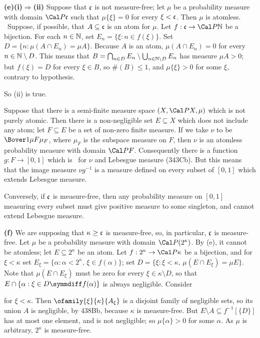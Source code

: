{{\bf (e)(i)$\Rightarrow$(ii)} Suppose that $\frak c$ is not
measure-free;  let $\mu$ be a probability measure with domain
$\Cal P\frak c$
such that $\mu\{\xi\}=0$ for every $\xi<\frak c$.   Then $\mu$ is
atomless.   \Prf\Quer\ Suppose, if possible, that $A\subseteq\frak c$ is
an atom for $\mu$.   Let $f:\frak c\to\Cal P\Bbb N$ be a bijection.
For each $n\in\Bbb N$, set $E_n=\{\xi:n\in f(\xi)\}$.   Set
$D=\{n:\mu(A\cap E_n)=\mu A\}$.   Because $A$ is an atom,
$\mu(A\cap E_n)=0$ for every $n\in\Bbb N\setminus D$.   This means
that $B=\bigcap_{n\in D}E_n\setminus\bigcup_{n\in\Bbb N\setminus D}E_n$
has measure $\mu A>0$;  but $f(\xi)=D$ for every $\xi\in B$, so
$\#(B)\le 1$, and $\mu\{\xi\}>0$ for some $\xi$, contrary to
hypothesis.\ \Bang\Qed

So (ii) is true.

\medskip

 Suppose that there is a semi-finite
measure space $(X,\Cal PX,\mu)$ which is not purely atomic.   Then there
is a non-negligible set $E\subseteq X$ which does not include any atom;
let $F\subseteq E$ be a set of non-zero finite measure.   If we take
$\nu$ to be $\Bover1{\mu F}\mu_F$, where $\mu_F$ is the subspace measure
on $F$, then $\nu$ is an atomless probability measure with domain
$\Cal PF$.
Consequently there is a function $g:F\to[0,1]$ which is \imp\ for $\nu$
and Lebesgue measure (343Cb).   But this means that the image measure
$\nu g^{-1}$ is a measure defined on every subset of $[0,1]$ which
extends Lebesgue measure.

\medskip

 Conversely, if $\frak c$ is
measure-free, then any probability measure on $[0,1]$ measuring every
subset must give positive measure to some singleton, and cannot extend
Lebesgue measure.

\medskip

{\bf (f)} We are supposing that $\kappa\ge\frak c$ is measure-free,
so, in particular, $\frak c$ is measure-free.
Let $\mu$ be a probability measure with domain
$\Cal P(2^{\kappa})$.   By (e), it cannot be atomless;  let
$E\subseteq 2^{\kappa}$ be an atom.   Let $f:2^{\kappa}\to\Cal P\kappa$
be a bijection, and for $\xi<\kappa$ set
$E_{\xi}=\{\alpha:\alpha<2^{\kappa},\,\xi\in f(\alpha)\}$;  set
$D=\{\xi:\xi<\kappa,\,\mu(E\cap E_{\xi})=\mu E\}$.   Note that
$\mu(E\cap E_{\xi})$ must be zero for every $\xi\in\kappa\setminus D$,
so that $E\cap\{\alpha:\xi\in D\symmdiff f(\alpha)\}$ is always
negligible.   Consider


\noindent for $\xi<\kappa$.   Then $\ofamily{\xi}{\kappa}{A_{\xi}}$ is a
disjoint family of negligible sets, so its union $A$ is negligible, by
438Bb, because $\kappa$ is measure-free.   But
$E\setminus A\subseteq f^{-1}[\{D\}]$ has at most one element, and is
not negligible;  so $\mu\{\alpha\}>0$ for some $\alpha$.   As $\mu$ is
arbitrary, $2^{\kappa}$ is measure-free.
}%

